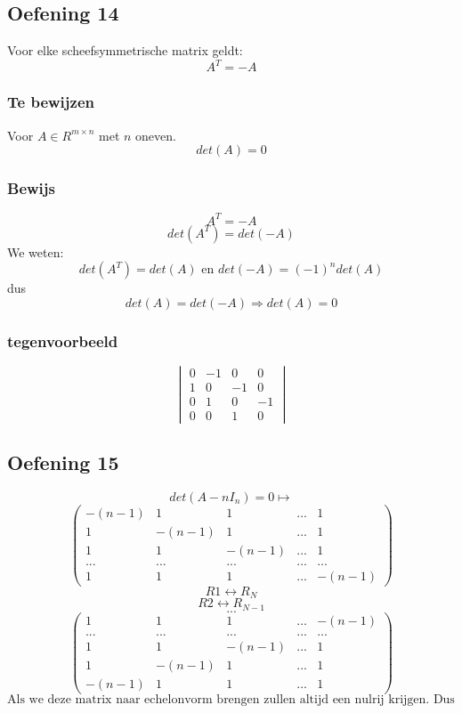 \documentclass[lineaire_algebra_oplossingen.tex]{subfiles}
\begin{document}
\subsection{Oefening 14}
Voor elke scheefsymmetrische matrix geldt:
\[
A^T= -A
\]
\subsubsection*{Te bewijzen}
Voor $A\in R^{m\times n}$ met $n$ oneven.
\[
det(A) = 0
\]
\subsubsection*{Bewijs}
\[
A^T = -A
\]
\[
det(A^T) = det(-A)
\]
We weten:
\[
det(A^T) = det(A) \text{ en } det(-A) = (-1)^n det(A)
\]
dus
\[
det(A) = det(-A) \Rightarrow det(A) = 0
\]

\subsubsection*{tegenvoorbeeld}
\[
\begin{vmatrix}
0 & -1 & 0 & 0\\
1 & 0 & -1 & 0\\
0 & 1 & 0 & -1\\
0 & 0 & 1 & 0
\end{vmatrix}
\]
\subsection{Oefening 15}
\[ det(A-nI_{n})=0 \longmapsto \]
\[
\begin{pmatrix}
-(n-1) & 1 & 1 &... & 1\\
1 & -(n-1) & 1 & ... & 1\\
1 & 1 & -(n-1) & ... & 1\\
... & ... & ... & ... & ...\\
1 & 1 & 1 & ... & -(n-1)
\end{pmatrix} 
\]
\[R1 \leftrightarrow R_{N} \]
\[R2 \leftrightarrow R_{N-1} \]
\[...\]
\[
\begin{pmatrix}
1 & 1 & 1 & ... & -(n-1)\\
... & ... & ... & ... & ...\\
1 & 1 & -(n-1) & ... & 1\\
1 & -(n-1) & 1 & ... & 1\\
-(n-1) & 1 & 1 &... & 1
\end{pmatrix} 
\]
\[ \text{Als we deze matrix naar echelonvorm brengen zullen altijd een nulrij krijgen. Dus det=0}\]
\end{document}
